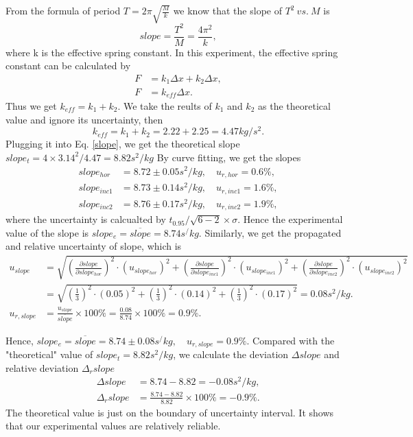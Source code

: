     From the formula of period $T=2\pi\sqrt{\frac{M}{k}}$ we know that the slope of $T^2\ vs.\ M$ is
    \begin{equation}\label{slope}
        slope=\frac{T^2}{M}=\frac{4\pi^2}{k},
    \end{equation}
    where k is the effective spring constant. In this experiment, the effective spring constant can be calculated by
    \[ 
    \begin{split}
        F&=k_1\Delta x+k_2\Delta x,\\
        F&=k_{eff}\Delta x.
    \end{split}
    \]
    Thus we get $k_{eff}=k_1+k_2$. We take the reults of $k_1$ and $k_2$ as the theoretical value and ignore its uncertainty, then
    \begin{equation}\label{keff}
        k_{eff}=k_1+k_2=2.22+2.25=4.47kg/s^2.
    \end{equation}
    Plugging it into Eq. \ref{slope}, we get the theoretical slope $slope_t=4\times 3.14^2/4.47=8.82s^2/kg$
    By curve fitting, we get the slopes
    \[
    \begin{split}
        slope_{hor}&=8.72\pm 0.05s^2/kg,\quad u_{r,hor}=0.6\%,\\
        slope_{inc1}&=8.73\pm 0.14s^2/kg,\quad u_{r,inc1}=1.6\%,\\
        slope_{inc2}&=8.76\pm 0.17s^2/kg,\quad u_{r,inc2}=1.9\%,
    \end{split}
    \]
    where the uncertainty is calcualted by $t_0.95/\sqrt{6-2}\times \sigma$.
    Hence the experimental value of the slope is $slope_e=\overline{slope}=8.74s^/kg$.
    Similarly, we get the propagated and relative uncertainty of slope, which is
    \[
    \begin{split}
        u_{slope}&=\sqrt{(\frac{\partial slope}{\partial slope_{hor}})^2\cdot(u_{slope_{hor}})^2+(\frac{\partial slope}{\partial slope_{inc1}})^2\cdot(u_{slope_{inc1}})^2+(\frac{\partial slope}{\partial slope_{inc2}})^2\cdot(u_{slope_{inc2}})^2}\\
        &=\sqrt{(\frac{1}{3})^2\cdot(0.05)^2+(\frac{1}{3})^2\cdot(0.14)^2+(\frac{1}{3})^2\cdot(0.17)^2}=0.08s^2/kg.\\
        u_{r,slope}&=\frac{u_{slope}}{\overline{slope}}\times100\%=\frac{0.08}{8.74}\times100\%=0.9\%.
    \end{split}
    \]

    Hence, $slope_e=\overline{slope}=8.74\pm 0.08s^/kg, \quad u_{r,slope}=0.9\%$. Compared with the "theoretical" value of $slope_t=8.82s^2/kg$, we calculate the deviation $\Delta slope$ and relative deviation $\Delta_r slope$
    \[
    \begin{split}
        \Delta slope&=8.74-8.82=-0.08s^2/kg,\\
        \Delta_r slope&=\frac{8.74-8.82}{8.82}\times 100\%=-0.9\%.
    \end{split}
    \]
    The theoretical value is just on the boundary of uncertainty interval. It shows that our experimental values are relatively reliable.

